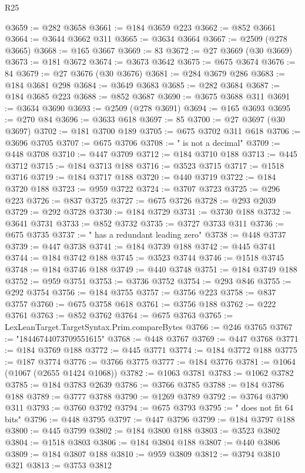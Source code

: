 \begin{lexlean}{R25}
\begin{coremodule}
@3659 := @282 @3658
@3661 := @184 @3659 @223
@3662 := @852 @3661
@3664 := @3644 @3662 @311
@3665 := @3634 @3664
@3667 := @2509 (@278 @3665)
@3668 := @165 @3667
@3669 := 83
@3672 := @27 @3669 (@30 @3669)
@3673 := @181 @3672
@3674 := @3673 @3642
@3675 := @675 @3674
@3676 := 84
@3679 := @27 @3676 (@30 @3676)
@3681 := @284 @3679 @286
@3683 := @184 @3681 @298
@3684 := @3649 @3683
@3685 := @282 @3684
@3687 := @184 @3685 @223
@3688 := @852 @3687
@3690 := @3675 @3688 @311
@3691 := @3634 @3690
@3693 := @2509 (@278 @3691)
@3694 := @165 @3693
@3695 := @270 @84
@3696 := @3633 @618
@3697 := 85
@3700 := @27 @3697 (@30 @3697)
@3702 := @181 @3700 @189
@3705 := @675 @3702 @311 @618
@3706 := @3696 @3705
@3707 := @675 @3706
@3708 := " is not a decimal"
@3709 := @448 @3708
@3710 := @447 @3709
@3712 := @184 @3710 @188
@3713 := @445 @3712
@3715 := @184 @3713 @188
@3716 := @3523 @3715
@3717 := @1518 @3716
@3719 := @184 @3717 @188
@3720 := @440 @3719
@3722 := @184 @3720 @188
@3723 := @959 @3722
@3724 := @3707 @3723
@3725 := @296 @223
@3726 := @837 @3725
@3727 := @675 @3726
@3728 := @293 @2039
@3729 := @292 @3728
@3730 := @184 @3729
@3731 := @3730 @188
@3732 := @3641 @3731
@3733 := @852 @3732
@3735 := @3727 @3733 @311
@3736 := @675 @3735
@3737 := " has a redundant leading zero"
@3738 := @448 @3737
@3739 := @447 @3738
@3741 := @184 @3739 @188
@3742 := @445 @3741
@3744 := @184 @3742 @188
@3745 := @3523 @3744
@3746 := @1518 @3745
@3748 := @184 @3746 @188
@3749 := @440 @3748
@3751 := @184 @3749 @188
@3752 := @959 @3751
@3753 := @3736 @3752
@3754 := @293 @846
@3755 := @292 @3754
@3756 := @184 @3755
@3757 := @3756 @223
@3758 := @837 @3757
@3760 := @675 @3758 @618
@3761 := @3756 @188
@3762 := @222 @3761
@3763 := @852 @3762
@3764 := @675 @3763
@3765 := LexLeanTarget.TargetSyntax.Prim.compareBytes
@3766 := @246 @3765
@3767 := "18446744073709551615"
@3768 := @448 @3767
@3769 := @447 @3768
@3771 := @184 @3769 @188
@3772 := @445 @3771
@3774 := @184 @3772 @188
@3775 := @187 @3774
@3776 := @3766 @3775
@3777 := @184 @3776
@3781 := @1064 (@1067 (@2655 @1424 @1068))
@3782 := @1063 @3781
@3783 := @1062 @3782
@3785 := @184 @3783 @2639
@3786 := @3766 @3785
@3788 := @184 @3786 @188
@3789 := @3777 @3788
@3790 := @1269 @3789
@3792 := @3764 @3790 @311
@3793 := @3760 @3792
@3794 := @675 @3793
@3795 := " does not fit 64 bits"
@3796 := @448 @3795
@3797 := @447 @3796
@3799 := @184 @3797 @188
@3800 := @445 @3799
@3802 := @184 @3800 @188
@3803 := @3523 @3802
@3804 := @1518 @3803
@3806 := @184 @3804 @188
@3807 := @440 @3806
@3809 := @184 @3807 @188
@3810 := @959 @3809
@3812 := @3794 @3810 @321
@3813 := @3753 @3812

\end{coremodule}
\end{lexlean}
